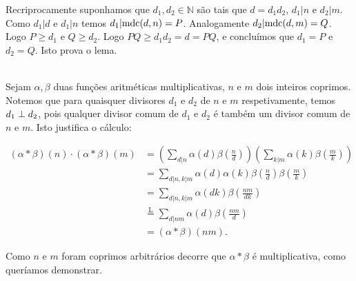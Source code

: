\documentclass[repertorio-solutions-1.tex]{subfiles}
\renewcommand*{\=}[1]{\ensuremath{\stackrel{\text{#1}}{=}}}
\begin{document}
\begin{solution}
\begin{lemma}
\begin{quickproof}
Recriprocamente suponhamos que $d_1,d_2\in\mathbb{N}$ são tais que $d=d_1d_2$,
$d_1|n$ e $d_2|m$. Como $d_1|d$ e $d_1|n$ temos $d_1|\text{mdc}(d,n)=P$.
Analogamente $d_2|\text{mdc}(d,m)=Q$.
Logo $P\geq d_1$ e $Q\geq d_2$.
Logo $PQ\geq d_1d_2=d=PQ$, e concluímos que $d_1=P$ e $d_2=Q$. Isto prova o lema.
\end{quickproof}
\end{lemma}
\\

Sejam $\alpha,\beta$ duas funções aritméticas multiplicativas, $n$ e $m$ dois inteiros coprimos.
Notemos que para quaisquer divisores $d_1$ e $d_2$ de $n$ e $m$ respetivamente,
temos $d_1\perp d_2$, pois qualquer divisor comum de $d_1$ e $d_2$
é também um divisor comum de $n$ e $m$. Isto justifica o cálculo:

\begin{align*}
(\alpha*\beta)(n)\cdot(\alpha*\beta)(m)
&=\left(\sum_{d|n}\alpha(d)\beta(\frac{n}{d})\right)
\left(\sum_{k|m}\alpha(k)\beta(\frac{m}{k})\right) \\
&=\sum_{d|n,k|m}\alpha(d)\alpha(k)\beta(\frac{n}{d})\beta(\frac{m}{k}) \\
&=\sum_{d|n,k|m}\alpha(dk)\beta(\frac{nm}{dk}) \\
&\={L}\sum_{d|nm}\alpha(d)\beta(\frac{nm}{d}) \\
&=(\alpha*\beta)(nm).
\end{align*}

Como $n$ e $m$ foram coprimos arbitrários decorre que $\alpha*\beta$
é multiplicativa, como queríamos demonstrar.
\end{solution}
\end{document}
